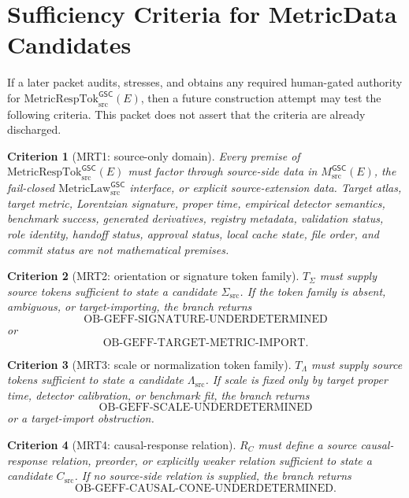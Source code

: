 \documentclass[11pt]{article}
\newcommand{\MsrcGSC}{M_{\mathrm{src}}^{\mathsf{GSC}}}
\newcommand{\MetricLaw}{\mathrm{MetricLaw}_{\mathrm{src}}^{\mathsf{GSC}}}
\newcommand{\MetricRespTok}{\mathrm{MetricRespTok}_{\mathrm{src}}^{\mathsf{GSC}}}
\newtheorem{criterion}{Criterion}
\begin{document}
\section{Sufficiency Criteria for MetricData Candidates}

If a later packet audits, stresses, and obtains any required human-gated
authority for \(\MetricRespTok(E)\), then a future construction attempt may
test the following criteria. This packet does not assert that the criteria are
already discharged.

\begin{criterion}[MRT1: source-only domain]
Every premise of \(\MetricRespTok(E)\) must factor through source-side data in
\(\MsrcGSC(E)\), the fail-closed \(\MetricLaw\) interface, or explicit
source-extension data. Target atlas, target metric, Lorentzian signature,
proper time, empirical detector semantics, benchmark success, generated
derivatives, registry metadata, validation status, role identity, handoff
status, approval status, local cache state, file order, and commit status are
not mathematical premises.
\end{criterion}

\begin{criterion}[MRT2: orientation or signature token family]
\(T_{\Sigma}\) must supply source tokens sufficient to state a candidate
\(\Sigma_{\mathrm{src}}\). If the token family is absent, ambiguous, or
target-importing, the branch returns
\[
  \mathrm{OB\mbox{-}GEFF\mbox{-}SIGNATURE\mbox{-}UNDERDETERMINED}
\]
or
\[
  \mathrm{OB\mbox{-}GEFF\mbox{-}TARGET\mbox{-}METRIC\mbox{-}IMPORT}.
\]
\end{criterion}

\begin{criterion}[MRT3: scale or normalization token family]
\(T_{\Lambda}\) must supply source tokens sufficient to state a candidate
\(\Lambda_{\mathrm{src}}\). If scale is fixed only by target proper time,
detector calibration, or benchmark fit, the branch returns
\[
  \mathrm{OB\mbox{-}GEFF\mbox{-}SCALE\mbox{-}UNDERDETERMINED}
\]
or a target-import obstruction.
\end{criterion}

\begin{criterion}[MRT4: causal-response relation]
\(R_C\) must define a source causal-response relation, preorder, or explicitly
weaker relation sufficient to state a candidate \(C_{\mathrm{src}}\). If no
source-side relation is supplied, the branch returns
\[
  \mathrm{OB\mbox{-}GEFF\mbox{-}CAUSAL\mbox{-}CONE\mbox{-}UNDERDETERMINED}.
\]
\end{criterion}
\end{document}

